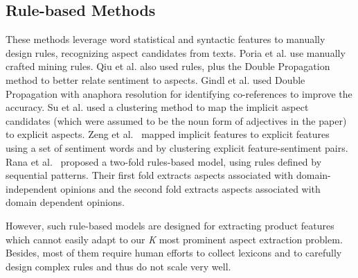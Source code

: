 \subsection{Rule-based Methods}
These methods leverage word statistical and 
syntactic features to manually design rules, recognizing aspect candidates 
from texts.
Poria et al. \cite{poria2014rule} use manually crafted mining rules. 
Qiu et al. \cite{DBLP:journals/coling/QiuLBC11} also used rules, plus the 
Double Propagation method to better relate sentiment to aspects. 
Gindl et al. \cite{gindl2013rule} used Double Propagation 
with anaphora resolution for identifying 
co-references to improve the accuracy. 
Su et al. \cite{su2008hidden} used a clustering method to map 
the implicit aspect candidates (which were assumed to be the noun form 
of adjectives in the paper) to explicit aspects. 
Zeng et al.~\cite{zeng2013classification} mapped implicit features 
to explicit features using a set of sentiment words and by clustering 
explicit feature-sentiment pairs.
Rana et al.~\cite{rana2017two} proposed a two-fold rules-based model, 
using rules defined by sequential patterns. Their first fold extracts aspects 
associated with domain-independent opinions and the 
second fold extracts aspects 
associated with domain dependent opinions. 

However, such rule-based models are designed for extracting product 
features which cannot easily adapt to our \emph{K} most prominent 
aspect extraction problem. Besides, most of them require human efforts 
to collect lexicons and to carefully design complex rules and 
thus do not scale very well. 

